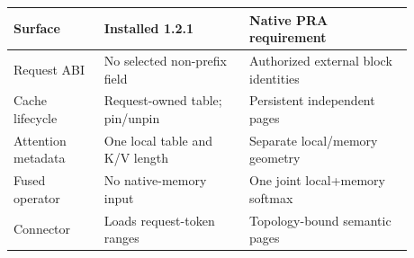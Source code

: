 \begin{tabular}{p{0.20\linewidth}p{0.32\linewidth}p{0.36\linewidth}}\toprule
Surface & Installed 1.2.1 & Native PRA requirement\\\midrule
Request ABI & No selected non-prefix field & Authorized external block identities \\
Cache lifecycle & Request-owned table; pin/unpin & Persistent independent pages \\
Attention metadata & One local table and K/V length & Separate local/memory geometry \\
Fused operator & No native-memory input & One joint local+memory softmax \\
Connector & Loads request-token ranges & Topology-bound semantic pages \\
\bottomrule\end{tabular}
